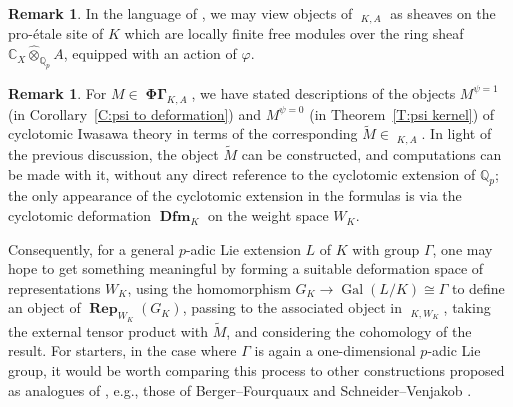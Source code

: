 \documentclass[12pt]{amsart}
\theoremstyle{definition}
\newtheorem{remark}[theorem]{Remark}
\numberwithin{equation}{theorem}
\newcommand{\CC}{\mathbb{C}}
\newcommand{\Qp}{\mathbb{Q}_p}
\newcommand{\QQ}{\mathbb{Q}}
\DeclareMathOperator{\Dfm}{\mathbf{Dfm}}
\DeclareMathOperator{\Gal}{Gal}
\DeclareMathOperator{\PhiGamma}{\mathbf{\Phi \Gamma}}
\DeclareMathOperator{\PhiGammatilde}{\widetilde{\mathbf{\Phi \Gamma}}}
\DeclareMathOperator{\Rep}{\mathbf{Rep}}
\begin{document}
\begin{remark}
In the language of \cite{kedlaya-liu1}, we may view objects of $\PhiGammatilde_{K,A}$
as sheaves on the pro-\'etale site of $K$ which are locally finite free modules over the ring sheaf $\CC_X \widehat{\otimes}_{\Qp} A$, equipped with an action of $\varphi$.
\end{remark}

\begin{remark}
For $M \in \PhiGamma_{K,A}$, we have stated descriptions of the objects $M^{\psi=1}$ 
(in Corollary~\ref{C:psi to deformation})
and $M^{\psi=0}$
(in Theorem~\ref{T:psi kernel}) of cyclotomic Iwasawa theory
in terms of the corresponding $\tilde{M} \in \PhiGammatilde_{K,A}$.
In light of the previous discussion, the object $\tilde{M}$ can be constructed, and computations can be made with it, without any direct reference to the cyclotomic extension of $\QQ_p$; the only appearance of the cyclotomic extension in the formulas is via the cyclotomic deformation $\Dfm_K$ on the weight space $W_K$.

Consequently, for a general $p$-adic Lie extension $L$ of $K$ with group $\Gamma$,
one may hope to get something meaningful by forming a suitable deformation space of representations $W_K$, using the homomorphism $G_K \to \Gal(L/K) \cong \Gamma$ to define an object of $\Rep_{W_K}(G_K)$, passing to the associated object in $\PhiGammatilde_{K,W_K}$,
taking the external tensor product with $\tilde{M}$,
and considering the cohomology of the result. For starters, in the case where $\Gamma$ is again a one-dimensional $p$-adic Lie group, it would be worth comparing this process to other constructions proposed as analogues of \cite{berger-explicit}, e.g.,
those of Berger--Fourquaux \cite{berger-fourquaux} and Schneider--Venjakob
\cite{schneider-venjakob}.
\end{remark}
\end{document}
